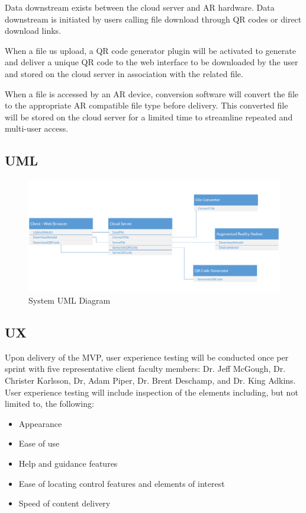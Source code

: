 Data downstream exists between the cloud server and AR hardware. Data downstream is initiated by users calling file download through QR codes or direct download links. 

When a file us upload, a QR code generator plugin will be activated to generate and deliver a unique QR code to the web interface to be downloaded by the user and stored on the cloud server in association with the related file. 

When a file is accessed by an AR device, conversion software will convert the file to the appropriate AR compatible file type before delivery. This converted file will be stored on the cloud server for a limited time to streamline repeated and multi-user access.
  
\subsection{UML}
 
	\begin{figure}[H]
	 	\centering
		\includegraphics[width=\textwidth]{UML.png}
		\caption{System UML Diagram} 
	 	\label{fig:SystemUML}	
	\end{figure}
    
\subsection{UX}

Upon delivery of the MVP, user experience testing will be conducted once per sprint with five representative client faculty members: Dr. Jeff McGough, Dr. Christer Karlsson, Dr, Adam Piper, Dr. Brent Deschamp, and Dr. King Adkins. User experience testing will include inspection of the elements including, but not limited to, the following:

\begin{itemize}
	\item Appearance
	\item Ease of use
	\item Help and guidance features
	\item Ease of locating control features and elements of interest
	\item Speed of content delivery 
\end{itemize}

